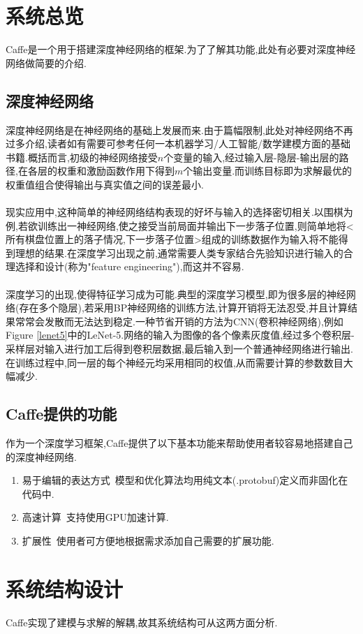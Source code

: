 \documentclass[a4paper]{article}
\begin{document}
	\section{系统总览}
	Caffe是一个用于搭建深度神经网络的框架.为了了解其功能,此处有必要对深度神经网络做简要的介绍.
	\subsection{深度神经网络}
	深度神经网络是在神经网络的基础上发展而来.由于篇幅限制,此处对神经网络不再过多介绍,读者如有需要可参考任何一本机器学习/人工智能/数学建模方面的基础书籍.概括而言,初级的神经网络接受$n$个变量的输入,经过输入层-隐层-输出层的路径,在各层的权重和激励函数作用下得到$m$个输出变量.而训练目标即为求解最优的权重值组合使得输出与真实值之间的误差最小.\\\\
	现实应用中,这种简单的神经网络结构表现的好坏与输入的选择密切相关.以围棋为例,若欲训练出一神经网络,使之接受当前局面并输出下一步落子位置,则简单地将<所有棋盘位置上的落子情况,下一步落子位置>组成的训练数据作为输入将不能得到理想的结果.在深度学习出现之前,通常需要人类专家结合先验知识进行输入的合理选择和设计(称为"feature engineering")\cite{zhouzhmldeeplearning},而这并不容易.\\\\
	深度学习的出现,使得特征学习成为可能.典型的深度学习模型,即为很多层的神经网络(存在多个隐层),若采用BP神经网络的训练方法,计算开销将无法忍受,并且计算结果常常会发散而无法达到稳定.一种节省开销的方法为CNN(卷积神经网络),例如Figure \ref{lenet5}中的LeNet-5.网络的输入为图像的各个像素灰度值,经过多个卷积层-采样层对输入进行加工后得到卷积层数据,最后输入到一个普通神经网络进行输出.在训练过程中,同一层的每个神经元均采用相同的权值,从而需要计算的参数数目大幅减少.
	\subsection{Caffe提供的功能}
	作为一个深度学习框架,Caffe提供了以下基本功能来帮助使用者较容易地搭建自己的深度神经网络.
	\begin{enumerate}
		\item 易于编辑的表达方式\ 模型和优化算法均用纯文本(.protobuf)定义而非固化在代码中.
		\item 高速计算\ 支持使用GPU加速计算.
		\item 扩展性\ 使用者可方便地根据需求添加自己需要的扩展功能.
	\end{enumerate}
	\section{系统结构设计}
	Caffe实现了建模与求解的解耦,故其系统结构可从这两方面分析.
\end{document}
